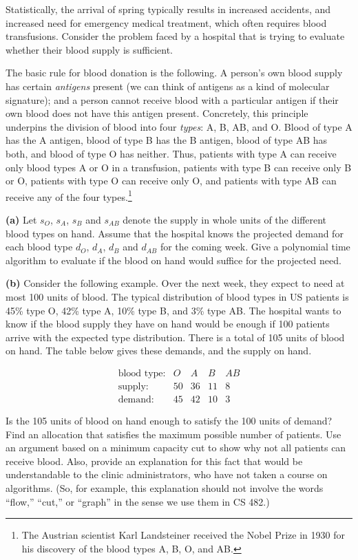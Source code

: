 \documentclass[12pt]{article}
\begin{document}
\begin{enumerate}
Statistically,
the arrival of spring typically results in increased accidents, and
increased need for emergency medical treatment, which often requires
blood transfusions.  Consider the problem faced by a hospital
that is trying to evaluate whether their blood supply is sufficient.

The basic rule for blood donation is the following.
A person's own blood supply has certain {\em antigens} present
(we can think of antigens as a kind of molecular signature);
and a person cannot receive blood with a particular antigen
if their own blood does not have this antigen present.
Concretely, this principle underpins the division
of blood into four {\em types}: A, B, AB, and O.
Blood of type A has the A antigen, blood of type B has the B antigen,
blood of type AB has both, and blood of type O has neither.
Thus, patients with type A can receive only blood types
A or O in a transfusion, patients with type B can receive only
B or O, patients with type O can receive only O,
and patients with type AB can receive any of the
four types.\footnote{The Austrian scientist Karl
Landsteiner received the Nobel Prize in 1930 for
his discovery of the blood types A, B, O, and AB. }

{\bf (a)} Let $s_O$, $s_A$, $s_B$ and $s_{AB}$ denote the supply in whole
units of the  different blood types on hand. Assume that the hospital knows
the projected demand for each blood type $d_O$, $d_A$, $d_B$ and $d_{AB}$
for the coming week.
Give a polynomial time algorithm to evaluate if the
blood on hand would suffice for the projected need.

{\bf (b)} Consider the following example. Over the next week, they expect to
need at most 100 units of blood. The typical distribution of blood types
in US patients is 45\% type O, 42\% type A, 10\% type B, and 3\% type AB.
The hospital wants to know if the blood supply they have on hand would
be enough if 100 patients arrive with the expected type distribution.
There is a total of 105 units of blood on hand.
The table below gives these demands, and the supply on hand.

$$\begin{array}{lcccc}
\mbox{blood type:} & O  & A  & B  & AB \\
\mbox{supply:}     & 50 & 36 & 11 & 8 \\
\mbox{demand:}     & 45 & 42 & 10 & 3
\end{array}$$

Is the 105 units of blood on hand enough to satisfy the 100 units of demand?
Find an allocation that satisfies the maximum possible number of patients.
Use an argument based on a
minimum capacity cut to show why not all patients can receive blood.
Also, provide an explanation for this fact
that would be understandable to the clinic administrators, who
have not taken a course on algorithms.
(So, for example, this explanation should not involve the words
``flow,'' ``cut,'' or ``graph'' in the sense we use them in CS 482.)


\end{enumerate}
\end{document}
